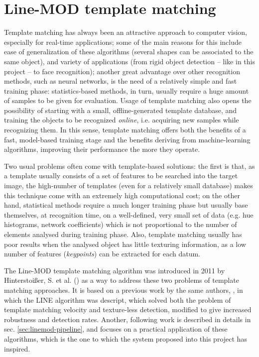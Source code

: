 \section{Line-MOD template matching} \label{sec:linemod}
Template matching has always been an attractive approach to computer vision,
especially for real-time applications; some of the main reasons for this
include ease of generalization of
these algorithms (several shapes can be associated to the same object), and
variety of applications (from rigid object detection -- like in this project --
to face recognition); another great advantage over other recognition methods,
such as neural networks, is the need of a relatively simple and fast training phase:
statistics-based methods, in turn, usually require a huge amount 
of samples to be given for evaluation. Usage of template matching also opens
the possibility of starting with a small, offline-generated template database, and training the
objects to be recognized \emph{online}, i.e. acquiring new samples while
recognizing them. In this sense, template matching offers both the benefits of
a fast, model-based training stage and the benefits deriving from
machine-learning algorithms, improving their performance the more they operate.

Two usual problems often come with template-based solutions: the first is that,
as a template usually consists of a set of features to be searched into the
target image, the high-number of templates (even for a relatively small
database) makes this technique come with an extremely high computational cost;
on the other hand, statistical methods require a much longer training phase but
usually base themselves, at recognition time, on a well-defined, very small set of
data (e.g. hue histograms, network coefficients) which is not proportional to the number of elements
analysed during training phase. Also, template matching usually has poor
results when the analysed object has little texturing information, as a low
number of features (\emph{keypoints}) can be extracted for each datum.

The Line-MOD template matching algorithm was introduced in 2011 by
Hinterstoi{\ss}er, S. et al. (\cite{linemod-paper}) as a way to address these
two problems of template matching approaches. It is based on a previous work by
the same authors, \cite{linemod-origins}, in which the LINE algorithm was
descript, which solved both the problem of template matching velocity and
texture-less detection, modified to give increased robustness and detection
rates. Another, following work is described in details in sec.
\ref{sec:linemod-pipeline}, and focuses on a practical application of these
algorithms, which is the one to which the system proposed into this project has
inspired.

